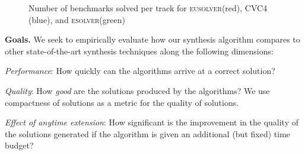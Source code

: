 \documentclass{llncs}
\renewcommand{\paragraph}[1]{\par\noindent\textbf{#1.}}
\newcommand{\esolver}{\textsc{esolver}\xspace}
\newcommand{\eusolver}{\textsc{eusolver}\xspace}
\begin{document}
\begin{wrapfigure}{l}{0.37\textwidth}%
\centering
  \caption{Number of benchmarks solved per track for \eusolver (red),
  CVC4 (blue), and \esolver (green)}
    \label{fig:num_solved}
\vspace*{-1ex}
\end{wrapfigure}
\paragraph{Goals}
We seek to empirically evaluate how our synthesis algorithm compares
to other state-of-the-art synthesis techniques along the following
dimensions:
\begin{inparaenum}[(a)]
\item
\emph{Performance}: How quickly can the algorithms arrive at a correct
solution?
\item
\emph{Quality}: How \emph{good} are the solutions produced by the
algorithms? We use compactness of solutions
as a metric for the quality of solutions.
\item
\emph{Effect of anytime extension}: How significant is the
improvement in the quality of the solutions generated
if the algorithm is given an additional (but fixed) time budget?
\end{inparaenum}
\end{document}
